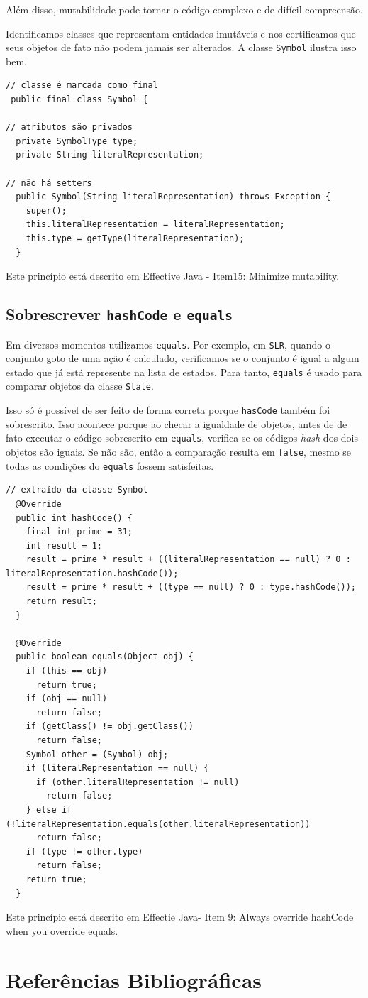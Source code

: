 \documentclass[11pt]{article}
\begin{document}
Além disso, mutabilidade pode tornar o código complexo e de difícil compreensão.

Identificamos classes que representam entidades imutáveis e nos certificamos que
seus objetos de fato não podem jamais ser alterados. A classe \texttt{Symbol} ilustra
isso bem.

\begin{verbatim}
// classe é marcada como final
 public final class Symbol {

// atributos são privados
  private SymbolType type;
  private String literalRepresentation;

// não há setters
  public Symbol(String literalRepresentation) throws Exception {
    super();
    this.literalRepresentation = literalRepresentation;
    this.type = getType(literalRepresentation);
  }
\end{verbatim}
Este princípio está descrito em Effective Java - Item15: Minimize mutability.

\subsection{Sobrescrever \texttt{hashCode} e \texttt{equals}}
\label{sec:orgheadline20}
Em diversos momentos utilizamos \texttt{equals}. Por exemplo, em \texttt{SLR}, quando 
o conjunto goto de uma ação é calculado, verificamos se o conjunto é igual a algum
estado que já está represente na lista de estados. Para tanto, \texttt{equals} é usado
para comparar objetos da classe \texttt{State}.

Isso só é possível de ser feito de forma correta porque \texttt{hasCode} também foi
sobrescrito. Isso acontece porque ao checar a igualdade de objetos, antes de
de fato executar o código sobrescrito em \texttt{equals}, verifica se os códigos \emph{hash}
dos dois objetos são iguais. Se não são, então a comparação resulta em \texttt{false},
mesmo se todas as condições do \texttt{equals} fossem satisfeitas.

\begin{verbatim}
// extraído da classe Symbol
  @Override
  public int hashCode() {
    final int prime = 31;
    int result = 1;
    result = prime * result + ((literalRepresentation == null) ? 0 : literalRepresentation.hashCode());
    result = prime * result + ((type == null) ? 0 : type.hashCode());
    return result;
  }

  @Override
  public boolean equals(Object obj) {
    if (this == obj)
      return true;
    if (obj == null)
      return false;
    if (getClass() != obj.getClass())
      return false;
    Symbol other = (Symbol) obj;
    if (literalRepresentation == null) {
      if (other.literalRepresentation != null)
        return false;
    } else if (!literalRepresentation.equals(other.literalRepresentation))
      return false;
    if (type != other.type)
      return false;
    return true;
  }
\end{verbatim}

Este princípio está descrito em Effectie Java- Item 9: Always override hashCode when you override equals.

\section{Referências Bibliográficas}
\label{sec:orgheadline21}
\end{document}
